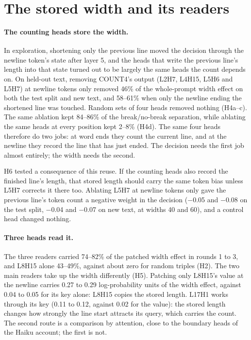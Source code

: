 \documentclass[11pt,a4paper]{article}
\begin{document}
\section{The stored width and its readers}
\label{sec:width}

\paragraph{The counting heads store the width.}
In exploration, shortening only the previous line moved the decision through the newline token's state after layer 5, and the heads that write the previous line's length into that state turned out to be largely the same heads the count depends on. On held-out text, removing COUNT4's output (L2H7, L4H15, L5H6 and L5H7) at newline tokens only removed 46\% of the whole-prompt width effect on both the test split and new text, and 58--61\% when only the newline ending the shortened line was touched. Random sets of four heads removed nothing (H4a--c). The same ablation kept 84--86\% of the break/no-break separation, while ablating the same heads at every position kept 2--8\% (H4d). The same four heads therefore do two jobs: at word ends they count the current line, and at the newline they record the line that has just ended. The decision needs the first job almost entirely; the width needs the second.

H6 tested a consequence of this reuse. If the counting heads also record the finished line's length, that stored length should carry the same token bias unless L5H7 corrects it there too. Ablating L5H7 at newline tokens only gave the previous line's token count a negative weight in the decision ($-$0.05 and $-$0.08 on the test split, $-$0.04 and $-$0.07 on new text, at widths 40 and 60), and a control head changed nothing.

\paragraph{Three heads read it.}
The three readers carried 74--82\% of the patched width effect in rounds 1 to 3, and L8H15 alone 43--49\%, against about zero for random triples (H2). The two main readers take up the width differently (H5). Patching only L8H15's value at the newline carries 0.27 to 0.29 log-probability units of the width effect, against 0.04 to 0.05 for its key alone: L8H15 copies the stored length. L17H1 works through its key (0.11 to 0.12, against 0.02 for the value): the stored length changes how strongly the line start attracts its query, which carries the count. The second route is a comparison by attention, close to the boundary heads of the Haiku account; the first is not.
\end{document}

